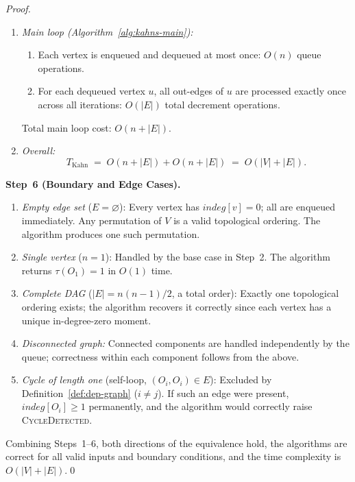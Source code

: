 \documentclass[12pt,openany]{book}
\numberwithin{equation}{chapter}
\theoremstyle{plain}
\theoremstyle{definition}
\theoremstyle{remark}
\numberwithin{equation}{chapter}
\theoremstyle{plain}
\begin{document}
\begin{proof}
\begin{enumerate}
  \item \emph{Main loop (Algorithm~\ref{alg:kahns-main}):}
        \begin{enumerate}
          \item Each vertex is enqueued and dequeued at most once:
                $O(n)$ queue operations.
          \item For each dequeued vertex $u$, all out-edges of $u$
                are processed exactly once across all iterations:
                $O(|E|)$ total decrement operations.
        \end{enumerate}
        Total main loop cost: $O(n + |E|)$.

  \item \emph{Overall:}
        \begin{equation}
          T_{\mathrm{Kahn}}
          \;=\; O(n + |E|) + O(n + |E|)
          \;=\; O(|V| + |E|).
          \label{eq:complexity-final}
        \end{equation}
\end{enumerate}

\medskip
\noindent\textbf{Step~6 (Boundary and Edge Cases).}
\begin{enumerate}
  \item \emph{Empty edge set} ($E = \varnothing$):
        Every vertex has $\mathit{indeg}[v] = 0$; all are enqueued
        immediately.  Any permutation of $V$ is a valid topological
        ordering.  The algorithm produces one such permutation.
  \item \emph{Single vertex} ($n = 1$):
        Handled by the base case in Step~2.  The algorithm returns
        $\tau(O_1) = 1$ in $O(1)$ time.
  \item \emph{Complete DAG} ($|E| = n(n-1)/2$, a total order):
        Exactly one topological ordering exists; the algorithm
        recovers it correctly since each vertex has a unique
        in-degree-zero moment.
  \item \emph{Disconnected graph:}
        Connected components are handled independently by the queue;
        correctness within each component follows from the above.
  \item \emph{Cycle of length one} (self-loop, $(O_i, O_i) \in E$):
        Excluded by Definition~\ref{def:dep-graph} ($i \neq j$).
        If such an edge were present, $\mathit{indeg}[O_i] \geq 1$
        permanently, and the algorithm would correctly raise
        \textsc{CycleDetected}.
\end{enumerate}

Combining Steps~1--6, both directions of the equivalence hold, the
algorithms are correct for all valid inputs and boundary conditions, and
the time complexity is $O(|V| + |E|)$.\qed
\end{proof}
\end{document}
